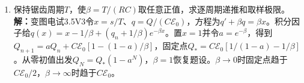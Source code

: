 \documentclass[UTF8,fontset=fandol,a4paper,11pt]{ctexart}
\begin{document}
\begin{enumerate}
\item 保持锯齿周期$T$，使$\beta=T/(RC)$取任意正值，求逐周期递推和取样极限。
\textbf{解：}变图电试3.5V3令$x=s/T$、$q=Q/(C\mathcal E_0)$，方程为$q'+\beta q=\beta x$。积分因子给$q(x)=x-1/\beta+(q_n+1/\beta)e^{-\beta x}$。置$x=1$并令$a=e^{-\beta}$，得到$Q_{n+1}=aQ_n+C\mathcal E_0[1-(1-a)/\beta]$，固定点$Q_*=C\mathcal E_0[1/(1-a)-1/\beta]$。从零初值出发$Q_N=Q_*(1-a^N)$，$\beta=1$恢复题设。$\beta\to0$时固定点趋于$C\mathcal E_0/2$，$\beta\to\infty$时趋于$C\mathcal E_0$。
\begin{center}\begin{minipage}{.98\linewidth}\centering
{}
\end{minipage}
\end{center}
\end{enumerate}
\end{document}
